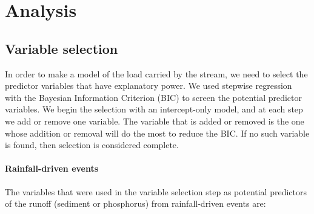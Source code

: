 \documentclass[10pt]{article}
\begin{document}
\section{Analysis}

\subsection{Variable selection}
In order to make a model of the load carried by the stream, we need to select the predictor variables that have explanatory power. We used stepwise regression with the Bayesian Information Criterion (BIC) to screen the potential predictor variables. We begin the selection with an intercept-only model, and at each step we add or remove one variable. The variable that is added or removed is the one whose addition or removal will do the most to reduce the BIC. If no such variable is found, then selection is considered complete.\\

\paragraph{Rainfall-driven events}


The variables that were used in the variable selection step as potential predictors of the runoff (sediment or phosphorus) from rainfall-driven events are:\\
\end{document}
